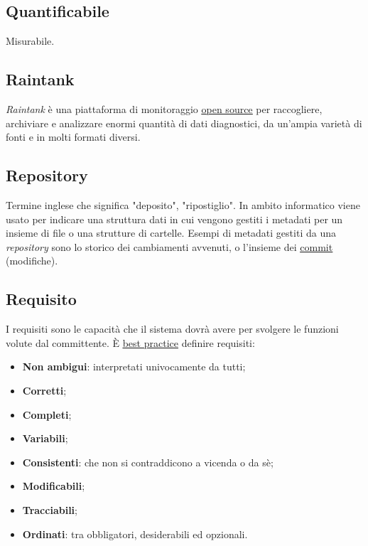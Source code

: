 	\subsection{Quantificabile}
	\label{sec:quantificabile}
	Misurabile.
		
	\newpage


	\subsection{Raintank}
	\label{sec:raintank}
	\emph{Raintank} è una piattaforma di monitoraggio \underline{\hyperref[sec:opensource]{open source}} per raccogliere, archiviare e analizzare enormi quantità di dati diagnostici, da un'ampia varietà di fonti e in molti formati diversi.


	\subsection{Repository}
	\label{sec:repo}
	Termine inglese che significa "deposito", "ripostiglio". In ambito informatico viene usato per indicare una struttura dati in cui vengono gestiti i metadati per un insieme di file o una strutture di cartelle. Esempi di metadati gestiti da una \emph{repository} sono lo storico dei cambiamenti avvenuti, o l'insieme dei \underline{\hyperref[sec:commit]{commit}} (modifiche).


	\subsection{Requisito}
	\label{sec:requisito}
	I requisiti sono le capacità che il sistema dovrà avere per svolgere le funzioni volute dal committente. È \underline{\hyperref[sec:bestpractice]{best practice}} definire requisiti:
	\begin{itemize}
	\item \textbf{Non ambigui}: interpretati univocamente da tutti;
	\item \textbf{Corretti};
	\item \textbf{Completi};
	\item \textbf{Variabili};
	\item \textbf{Consistenti}: che non si contraddicono a vicenda o da sè;
	\item \textbf{Modificabili};
	\item \textbf{Tracciabili};
	\item \textbf{Ordinati}: tra obbligatori, desiderabili ed opzionali.
	\end{itemize}


